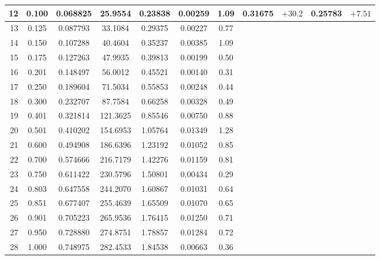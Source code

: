 \documentclass[11pt,a4paper]{article}
\begin{document}
\begin{center}
\begin{tabular}{rcccccc rr rr}
12 & 0.100 & 0.068825 & 25.9554 & 0.23838 & 0.00259 & 1.09 & 0.31675 & $+30.2$ & 0.25783 & $+7.51$ \\
\midrule
13 & 0.125 & 0.087793 & 33.1084 & 0.29375 & 0.00227 & 0.77 & & & & \\
14 & 0.150 & 0.107288 & 40.4604 & 0.35237 & 0.00385 & 1.09 & & & & \\
15 & 0.175 & 0.127263 & 47.9935 & 0.39813 & 0.00199 & 0.50 & & & & \\
16 & 0.201 & 0.148497 & 56.0012 & 0.45521 & 0.00140 & 0.31 & & & & \\
17 & 0.250 & 0.189604 & 71.5034 & 0.55853 & 0.00248 & 0.44 & & & & \\
18 & 0.300 & 0.232707 & 87.7584 & 0.66258 & 0.00328 & 0.49 & & & & \\
19 & 0.401 & 0.321814 & 121.3625 & 0.85546 & 0.00750 & 0.88 & & & & \\
20 & 0.501 & 0.410202 & 154.6953 & 1.05764 & 0.01349 & 1.28 & & & & \\
21 & 0.600 & 0.494908 & 186.6396 & 1.23192 & 0.01052 & 0.85 & & & & \\
22 & 0.700 & 0.574666 & 216.7179 & 1.42276 & 0.01159 & 0.81 & & & & \\
23 & 0.750 & 0.611422 & 230.5796 & 1.50801 & 0.00434 & 0.29 & & & & \\
24 & 0.803 & 0.647558 & 244.2070 & 1.60867 & 0.01031 & 0.64 & & & & \\
25 & 0.851 & 0.677407 & 255.4639 & 1.65509 & 0.01070 & 0.65 & & & & \\
26 & 0.901 & 0.705223 & 265.9536 & 1.76415 & 0.01250 & 0.71 & & & & \\
27 & 0.950 & 0.728880 & 274.8751 & 1.78857 & 0.01284 & 0.72 & & & & \\
28 & 1.000 & 0.748975 & 282.4533 & 1.84538 & 0.00663 & 0.36 & & & & \\
\bottomrule
\end{tabular}
\end{center}

\end{document}

